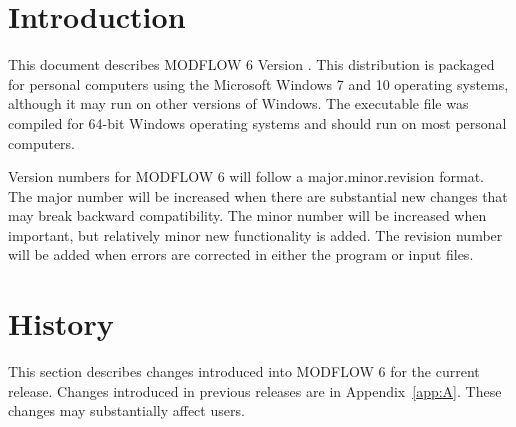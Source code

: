 \documentclass[11pt,twoside,twocolumn]{usgsreport}
\begin{document}
\ifdef{\makefrontcoveralt}{\makefrontcoveralt}{\makefrontcover}

\ifdef{\makefrontmatterabv}{\makefrontmatterabv}{\makefrontmatter}

\onecolumn
\pagestyle{body}
\RaggedRight
{}
\pagestyle{body}
\setlength{\parindent}{1.5pc}

\section{Introduction}
This document describes MODFLOW 6 Version \modflowversion.  This distribution is packaged for personal computers using the Microsoft Windows 7 and 10 operating systems, although it may run on other versions of Windows.  The executable file was compiled for 64-bit Windows operating systems and should run on most personal computers.

Version numbers for MODFLOW 6 will follow a major.minor.revision format.  The major number will be increased when there are substantial new changes that may break backward compatibility.  The minor number will be increased when important, but relatively minor new functionality is added.  The revision number will be added when errors are corrected in either the program or input files.

\section{History}
This section describes changes introduced into MODFLOW 6 for the current release.  Changes introduced in previous releases are in Appendix~\ref{app:A}. These changes may substantially affect users.
\end{document}
